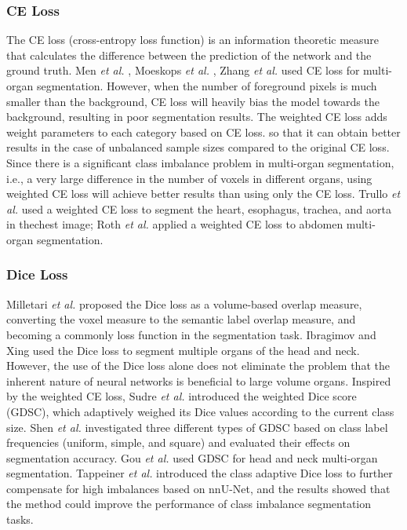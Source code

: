 \documentclass[lettersize,journal]{IEEEtran}
\begin{document}
\subsubsection{CE Loss}
The CE loss (cross-entropy loss function) \cite{176} is an information theoretic measure that calculates the difference between the prediction of the network and the ground truth. Men {\it{et al.}} \cite{58}, Moeskops {\it{et al.}} \cite{95}, Zhang {\it{et al.}} \cite{48} used CE loss for multi-organ segmentation. However, when the number of foreground pixels is much smaller than the background, CE loss will heavily bias the model towards the background, resulting in poor segmentation results. The weighted CE loss \cite{180} adds weight parameters to each category based on CE loss. so that it can obtain better results in the case of unbalanced sample sizes compared to the original CE loss. Since there is a significant class imbalance problem in multi-organ segmentation, i.e., a very large difference in the number of voxels in different organs, using weighted CE loss will achieve better results than using only the CE loss. Trullo {\it{et al.}} \cite{83} used a weighted CE loss to segment the heart, esophagus, trachea, and aorta in thechest image; Roth {\it{et al.}} \cite{61} applied a weighted CE loss to abdomen multi-organ segmentation.

\subsubsection{Dice Loss}
Milletari {\it{et al.}} \cite{100} proposed the Dice loss as a volume-based overlap measure, converting the voxel measure to the semantic label overlap measure, and becoming a commonly loss function in the segmentation task. Ibragimov and Xing \cite{37} used the Dice loss to segment multiple organs of the head and neck. However, the use of the Dice loss alone does not eliminate the problem that the inherent nature of neural networks is beneficial to large volume organs. Inspired by the weighted CE loss, Sudre {\it{et al.}} \cite{177} introduced the weighted Dice score (GDSC), which adaptively weighed its Dice values according to the current class size. Shen {\it{et al.}} \cite{59} investigated three different types of GDSC based on class label frequencies (uniform, simple, and square) and evaluated their effects on segmentation accuracy. Gou {\it{et al.}} \cite{42} used GDSC for head and neck multi-organ segmentation. Tappeiner {\it{et al.}} \cite{181} introduced the class adaptive Dice loss to further compensate for high imbalances based on nnU-Net, and the results showed that the method could improve the performance of class imbalance segmentation tasks.
\end{document}
